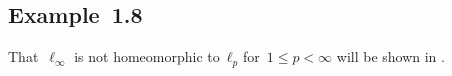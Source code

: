 \subsection{Example~1.8}

That~$\ell_∞$ is not homeomorphic to~$ℓ_p$ for~$1 ≤ p < ∞$ will be shown in .
